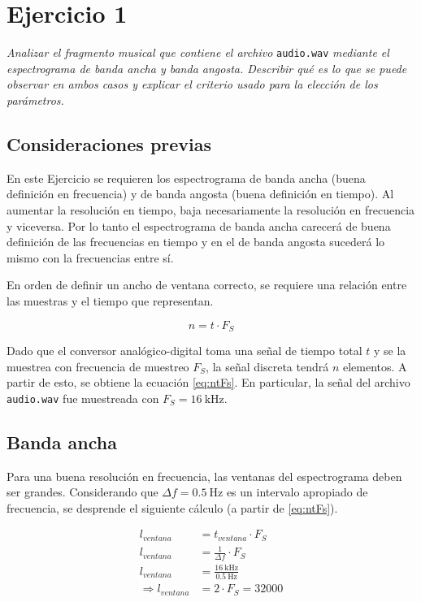 
\section{Ejercicio 1} \label{sec:ej1}
	\begin{flushleft}
		\textit{Analizar el fragmento musical que contiene el archivo} \texttt{audio.wav} \textit{mediante el
espectrograma de banda ancha y banda angosta. Describir qué es lo que se puede observar en
ambos casos y explicar el criterio usado para la elección de los parámetros.}
	\end{flushleft}

	\subsection{Consideraciones previas}
		En este Ejercicio se requieren los espectrograma de banda ancha (buena definición en frecuencia) y de banda angosta (buena definición en tiempo). Al aumentar la resolución en tiempo, baja necesariamente la resolución en frecuencia y viceversa. Por lo tanto el espectrograma de banda ancha carecerá de buena definición de las frecuencias en tiempo y en el de banda angosta sucederá lo mismo con la frecuencias entre sí.

		En orden de definir un ancho de ventana correcto, se requiere una relación entre las muestras y el tiempo que representan.

			\begin{equation}
				n = t \cdot F_S
			\end{equation}
			\label{eq:ntFs}

		Dado que el conversor analógico-digital toma una señal de tiempo total $t$ y se la muestrea con frecuencia de muestreo $F_S$, la señal discreta tendrá $n$ elementos. A partir de esto, se obtiene la ecuación \eqref{eq:ntFs}. En particular, la señal del archivo \texttt{audio.wav} fue muestreada con $F_S=\SI{16}{\kHz}$.


	\subsection{Banda ancha}
		Para una buena resolución en frecuencia, las ventanas del espectrograma deben ser grandes. Considerando que $\Delta f=\SI{0.5}{\Hz}$ es un intervalo apropiado de frecuencia, se desprende el siguiente cálculo (a partir de \eqref{eq:ntFs}).

		\begin{align*}
			l_{ventana} &= t_{ventana} \cdot F_S\\
			l_{ventana} &= \frac{1}{\Delta f} \cdot F_S\\
			l_{ventana} &= \frac{\SI{16}{\kHz}}{\SI{0.5}{\Hz}}\\
			\Rightarrow l_{ventana} &= 2 \cdot F_S = \num{32000}\\
		\end{align*}

